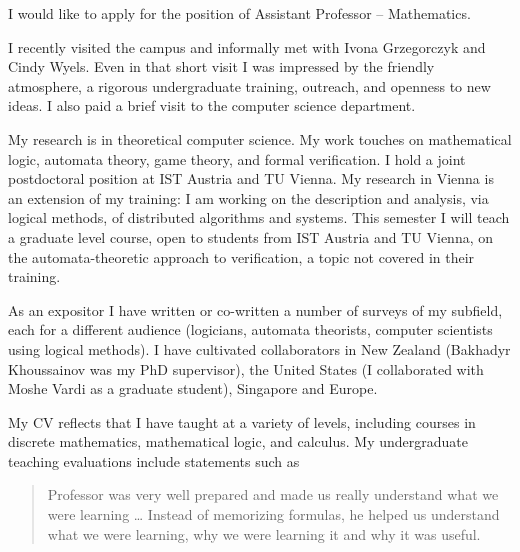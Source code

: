 \documentclass{letter}
\begin{document}
\begin{letter}{}


\signature{\mbox{ }\\[-1.5 cm]Sasha Rubin\\\texttt{sasha.rubin@gmail.com}}

\opening{}

I would like to apply for the position of Assistant Professor -- Mathematics.

I recently visited the campus and informally met with Ivona Grzegorczyk and Cindy Wyels. Even in that short visit I was impressed by the friendly atmosphere, a rigorous undergraduate training, outreach, and openness to new ideas. I also paid a brief visit to the computer science department.


My research is in theoretical computer science. My work touches on mathematical logic, automata theory, game theory, and formal verification.  I hold a joint postdoctoral position at IST Austria and TU Vienna. My research in Vienna is an extension of my training: I am working on the description and analysis, via logical methods, of distributed algorithms and systems. This semester I will teach a graduate level course, open to students from IST Austria and TU Vienna, on the automata-theoretic approach to verification, a topic not covered in their training.

As an expositor I have written or co-written a number of surveys of my subfield, each for a different audience (logicians, automata theorists, computer scientists using logical methods). I have cultivated collaborators in New Zealand (Bakhadyr Khoussainov was my PhD supervisor), the United States (I collaborated with Moshe Vardi as a graduate student), Singapore and Europe.

My CV reflects that I have taught at a variety of levels, including courses in discrete mathematics, mathematical logic, and calculus. My undergraduate teaching evaluations include statements such as 
\begin{quote}
Professor was very well prepared and made us really understand what we were learning \dots 
Instead of memorizing formulas, he helped us understand what we were learning, why we
were learning it and why it was useful.
\end{quote}


\end{letter}
\end{document}
